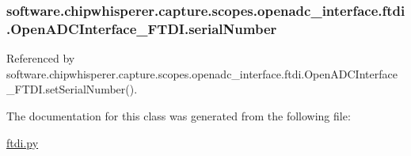 \subsubsection[{serial\+Number}]{\setlength{\rightskip}{0pt plus 5cm}software.\+chipwhisperer.\+capture.\+scopes.\+openadc\+\_\+interface.\+ftdi.\+Open\+A\+D\+C\+Interface\+\_\+\+F\+T\+D\+I.\+serial\+Number}\label{classsoftware_1_1chipwhisperer_1_1capture_1_1scopes_1_1openadc__interface_1_1ftdi_1_1OpenADCInterface__FTDI_a703c707f97f83493e3583976a2e98626}


Referenced by software.\+chipwhisperer.\+capture.\+scopes.\+openadc\+\_\+interface.\+ftdi.\+Open\+A\+D\+C\+Interface\+\_\+\+F\+T\+D\+I.\+set\+Serial\+Number().



The documentation for this class was generated from the following file\+:\begin{DoxyCompactItemize}
\item 
\hyperlink{ftdi_8py}{ftdi.\+py}\end{DoxyCompactItemize}
